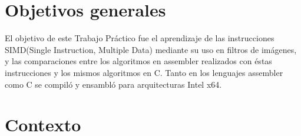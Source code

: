 \documentclass[a4paper]{article}
\begin{document}
\thispagestyle{empty}

\maketitle
\newpage

\thispagestyle{empty}
\vfill
\begin{abstract}
En el presente trabajo se describe el an\'alisis de siertos filtros para im\'agenes, comparando las versiones realizadas en C y en assembler con procesamiento SIMD.


El an\'alisis principal ser\'a el tiempo que tardan dichos algoritmos y c\'omo se ha encarado el algoritmo en cada lenguaje.
\end{abstract}
\newpage
\thispagestyle{empty}
\vspace{3cm}
\tableofcontents
\newpage


\normalsize
\newpage

\section{Objetivos generales}

El objetivo de este Trabajo Pr\'actico fue el aprendizaje de las instrucciones SIMD(Single Instruction, Multiple Data) mediante su uso en filtros de im\'agenes, y las comparaciones entre los algoritmos en assembler realizados con \'estas instrucciones y los mismos algoritmos en C.
Tanto en los lenguajes assembler como C se compil\'o y ensambl\'o para arquitecturas Intel x64.



\section{Contexto}
\end{document}

